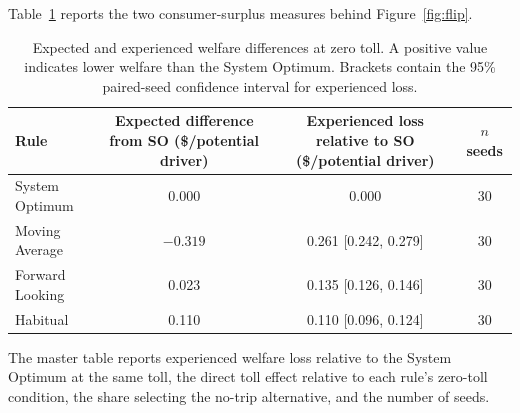 \documentclass{article}
\begin{document}
Table~\ref{tab:flip} reports the two consumer-surplus measures behind Figure~\ref{fig:flip}.

\begin{table}[htbp]
\centering
\footnotesize
\setlength{\tabcolsep}{3pt}
\begin{tabular}{lccc}
\toprule
Rule & \shortstack{Expected difference\\from SO (\$/potential driver)} & \shortstack{Experienced loss\\relative to SO (\$/potential driver)} & \shortstack{$n$\\seeds} \\
\midrule
System Optimum & 0.000 & 0.000 & 30 \\
Moving Average & $-0.319$ & 0.261 [0.242, 0.279] & 30 \\
Forward Looking & 0.023 & 0.135 [0.126, 0.146] & 30 \\
Habitual & 0.110 & 0.110 [0.096, 0.124] & 30 \\
\bottomrule
\end{tabular}
\caption{Expected and experienced welfare differences at zero toll. A positive value indicates lower welfare than the System Optimum. Brackets contain the 95\% paired-seed confidence interval for experienced loss.}
\label{tab:flip}
\end{table}

The master table reports experienced welfare loss relative to the System Optimum at the same toll, the direct toll effect relative to each rule's zero-toll condition, the share selecting the no-trip alternative, and the number of seeds.
\end{document}
